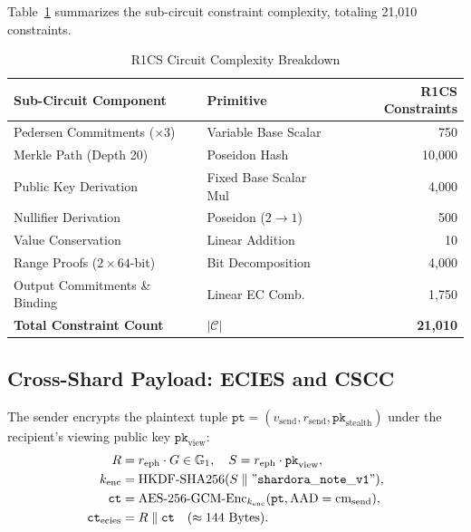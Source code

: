 \documentclass[journal,10pt,twocolumn]{IEEEtran}
\theoremstyle{definition}
\theoremstyle{remark}
\begin{document}
Table~\ref{tab:r1cs_complexity} summarizes the sub-circuit constraint complexity, totaling 21,010 constraints.

\begin{table}[h]
\centering
\caption{R1CS Circuit Complexity Breakdown}
\label{tab:r1cs_complexity}
\begin{tabular}{llr}
\toprule
\textbf{Sub-Circuit Component} & \textbf{Primitive} & \textbf{R1CS Constraints} \\
\midrule
Pedersen Commitments ($\times 3$) & Variable Base Scalar & 750 \\
Merkle Path (Depth 20) & Poseidon Hash & 10,000 \\
Public Key Derivation & Fixed Base Scalar Mul & 4,000 \\
Nullifier Derivation & Poseidon ($2 \to 1$) & 500 \\
Value Conservation & Linear Addition & 10 \\
Range Proofs ($2 \times 64$-bit) & Bit Decomposition & 4,000 \\
Output Commitments \& Binding & Linear EC Comb. & 1,750 \\
\midrule
\textbf{Total Constraint Count} & $|\mathcal{C}|$ & \textbf{21,010} \\
\bottomrule
\end{tabular}
\end{table}

\subsection{Cross-Shard Payload: ECIES and CSCC}
The sender encrypts the plaintext tuple $\mathtt{pt} = (v_{\text{send}}, r_{\text{send}}, \mathtt{pk}_{\text{stealth}})$ under the recipient's viewing public key $\mathtt{pk}_{\text{view}}$:
\begin{align}
R &= r_{\text{eph}} \cdot G \in \mathbb{G}_1, \quad S = r_{\text{eph}} \cdot \mathtt{pk}_{\text{view}}, \\
k_{\text{enc}} &= \text{HKDF-SHA256}(S \parallel \mathtt{"shardora\_note\_v1"}), \\
\mathtt{ct} &= \text{AES-256-GCM-Enc}_{k_{\text{enc}}}(\mathtt{pt}, \text{AAD} = \text{cm}_{\text{send}}), \\
\mathtt{ct}_{\text{ecies}} &= R \parallel \mathtt{ct} \quad (\approx 144 \text{ Bytes}).
\end{align}
\end{document}
